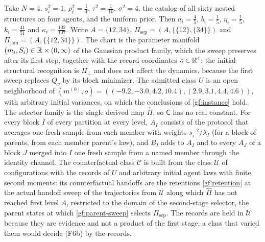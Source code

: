 Take $N=4$, $s_i^2=1$, $\rho_i^2=\tfrac14$, $\tau^2=\tfrac1{10}$, $\sigma^2=4$,
the catalog of all sixty nested structures on four agents, and the uniform
prior. Then $a_i=\tfrac45$, $b_i=\tfrac15$, $\eta_i=\tfrac15$, $k_i=\tfrac{41}{51}$
and $\kappa_i=\tfrac{102}{107}$. Write $A=\{12,34\}$, $\Pi_{\mathrm{sep}}=(A,
\{\{12\},\{34\}\})$ and $\Pi_{\mathrm{join}}=(A,\{\{12,34\}\})$. The chart is the
parameter manifold $(m_i,S_i)\in\mathbb R\times(0,\infty)$ of the Gaussian product
family, which the sweep preserves after its first step, together with the
record coordinates $o\in\mathbb R^4$; the initial structural recognition is
$\Pi_\perp$ and does not affect the dynamics, because the first sweep
replaces $Q_\nu$ by its block minimizer. The admitted class $U$ is an open
neighborhood of $(m^{(0)},o)=((-9.2,-3.0,4.2,10.4),(2.9,3.1,4.4,4.6))$, with
arbitrary initial variances, on which the conclusions of
\cref{gf:instance} hold. The selector family is the single derived map
$\hat\Pi$, so $\mathsf C$ has no real constant. For every block $I$ of every
partition at every level, $A_I$ consists of the protocol that averages one
fresh sample from each member with weights $s_i^{-2}/\lambda_I$ (for a block
of parents, from each member parent's law), and $B_I$ adds to $A_I$ and to
every $A_J$ of a block $J$ merged into $I$ one fresh sample from a named
member through the identity channel. The counterfactual class $\mathcal C$
is built from the class $\mathcal U$ of configurations with the records of
$U$ and arbitrary initial agent laws with finite second moments: its
counterfactual handoffs are the retentions \cref{gf:retention} at the actual
handoff sweep of the trajectories from $\mathcal U$ along which $\hat\Pi$ has
not reached first level $A$, restricted to the domain of the second-stage
selector, the parent states at which \cref{gf:parent-sweep} selects
$\Pi_{\mathrm{sep}}$. The records are held in $\mathcal U$ because they are
evidence and not a product of the first stage; a class that varied them
would decide (F6b) by the records.

